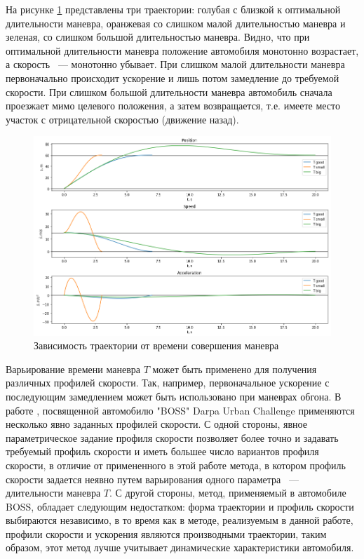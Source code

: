 На рисунке \ref{img:quntic_bad_t} представлены три траектории:
голубая с близкой к оптимальной длительности маневра, оранжевая со слишком малой длительностью маневра и зеленая, со
слишком большой длительностью маневра. Видно, что при оптимальной длительности маневра положение автомобиля монотонно
возрастает, а скорость ~--- монотонно убывает. При слишком малой длительности маневра первоначально происходит
ускорение и лишь потом замедление до требуемой скорости. При слишком большой длительности маневра автомобиль сначала
проезжает мимо целевого положения, а затем возвращается, т.е. имеете место участок с отрицательной скоростью
(движение назад).

\begin{figure}[h]
      \centering
      \includegraphics[width=\linewidth]{images/quintic_bad_t}
      \caption{Зависимость траектории от времени совершения маневра}
      \label{img:quntic_bad_t}
\end{figure}

Варьирование времени маневра $T$ может быть применено для получения различных профилей скорости. Так, например,
первоначальное ускорение с последующим замедлением может быть использовано при маневрах обгона.
В работе \cite{darpa_boss}, посвященной автомобилю "BOSS" Darpa Urban Challenge применяются несколько явно заданных
профилей скорости. С одной стороны, явное параметрическое задание профиля скорости позволяет более точно и задавать
требуемый профиль скорости и иметь большее число вариантов профиля скорости, в отличие от примененного в этой работе
метода, в котором профиль скорости задается неявно путем варьирования одного параметра ~--- длительности маневра $T$.
С другой стороны, метод, применяемый в автомобиле BOSS, обладает следующим недостатком: форма траектории и профиль
скорости выбираются независимо, в то время как в методе, реализуемым  в данной работе, профили скорости и ускорения
являются производными траектории, таким образом, этот метод лучше учитывает динамические характеристики автомобиля.

